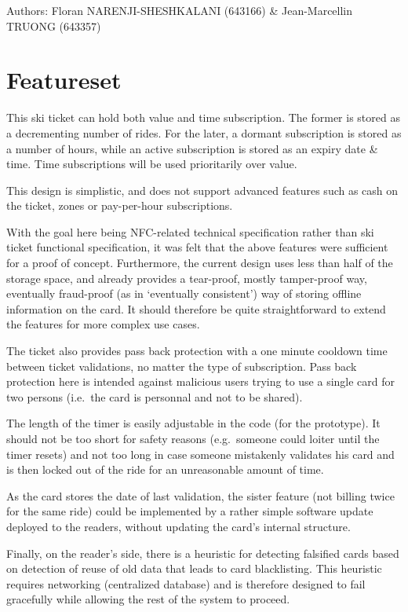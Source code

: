 \documentclass[paper=a4, fontsize=11pt]{scrartcl}
\author{Floran NARENJI-SHESHKALANI \& Jean-Marcellin TRUONG}
\begin{document}
Authors: Floran NARENJI-SHESHKALANI (643166) \& Jean-Marcellin TRUONG (643357)

\section{Featureset}

This ski ticket can hold both value and time subscription.
The former is stored as a decrementing number of rides.
For the later, a dormant subscription is stored as a number of hours, while an
active subscription is stored as an expiry date \& time.
Time subscriptions will be used prioritarily over value.

This design is simplistic, and does not support advanced features such as cash
on the ticket, zones or pay-per-hour subscriptions.

With the goal here being NFC-related technical specification rather than ski
ticket functional specification, it was felt that the above features were
sufficient for a proof of concept.
Furthermore, the current design uses less than half of the storage space, and
already provides a tear-proof, mostly tamper-proof way, eventually fraud-proof
(as in `eventually consistent') way of storing offline information on the card.
It should therefore be quite straightforward to extend the features for more
complex use cases.

The ticket also provides pass back protection with a one minute cooldown time
between ticket validations, no matter the type of subscription.
Pass back protection here is intended against malicious users trying to
use a single card for two persons (i.e.\ the card is personnal and not to be
shared).

The length of the timer is easily adjustable in the code (for the prototype).
It should not be too short for safety reasons (e.g.\ someone could loiter until
the timer resets) and not too long in case someone mistakenly validates his card
and is then locked out of the ride for an unreasonable amount of time.

As the card stores the date of last validation, the sister feature (not
billing twice for the same ride) could be implemented by a rather simple
software update deployed to the readers, without updating the
card's internal structure.

Finally, on the reader's side, there is a heuristic for detecting falsified
cards based on detection of reuse of old data that leads to card blacklisting.
This heuristic requires networking (centralized database) and is therefore
designed to fail gracefully while allowing the rest of the system to proceed.
\end{document}
